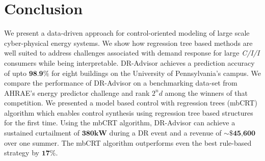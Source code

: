 \documentclass{sig-alternate-ipsn13}
\theoremstyle{definition}
\begin{document}
\section{Conclusion}
\label{sec:discussion}
We present a data-driven approach for control-oriented modeling of large scale cyber-physical energy systems.
We show how regression tree based methods are well suited to address challenges associated with demand response for large \textit{C/I/I} consumers while being interpretable. 
DR-Advisor achieves a prediction accuracy of upto $\textbf{98.9\%}$ for eight buildings on the University of Pennsylvania's campus.
We compare the performance of DR-Advisor on a benchmarking data-set from AHRAE's energy predictor challenge and rank $2^nd$ among the winners of that competition.
We presented a model based control with regression trees (mbCRT) algorithm which enables control synthesis using regression tree based structures for the first time. Using the mbCRT algorithm, DR-Advisor can achieve a sustained curtailment of $\textbf{380kW}$ during a DR event and a revenue of $\sim\$\textbf{45,600}$ over one summer.
The mbCRT algorithm outperforms even the best rule-based strategy by $\textbf{17\%}$.


{ \small


}
\end{document}
